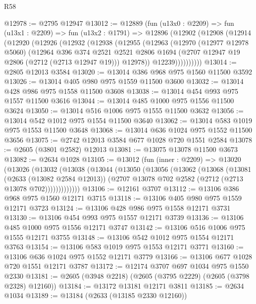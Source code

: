 \begin{lexlean}{R58}
\begin{coremodule}
@12978 := @2795 @12947
@13012 := @12889
    (fun (u13x0 : @2209) =>
    fun (u13x1 : @2209) =>
    fun (u13x2 : @1791) =>
    @12896
      (@12902
        (@12908
          (@12914
            (@12920
              (@12926
                (@12932
                  (@12938
                    (@12955
                      (@12963
                        (@12970
                          (@12977 @12978 @5060)
                          (@12964
                            @396
                            @374
                            @2521
                            @2521
                            @2806
                            @1694
                            (@2707 @12947 @19 @2806 (@2712 (@2713 @12947 @19)))
                            @12978))
                        @12239))))))))))
@13014 := @2805 @12013 @3584
@13020 := @13014 @386 @968 @975 @1560 @11500 @3592
@13026 := @13014 @405 @980 @975 @1559 @11500 @3600
@13032 := @13014 @428 @986 @975 @1558 @11500 @3608
@13038 := @13014 @454 @993 @975 @1557 @11500 @3616
@13044 := @13014 @485 @1000 @975 @1556 @11500 @3624
@13050 := @13014 @516 @1006 @975 @1555 @11500 @3632
@13056 := @13014 @542 @1012 @975 @1554 @11500 @3640
@13062 := @13014 @583 @1019 @975 @1553 @11500 @3648
@13068 := @13014 @636 @1024 @975 @1552 @11500 @3656
@13075 := @2742 @12013 @3584 @677 @1028 @720 @1551 @2584
@13078 := @2605 (@3801 @2582) @12013
@13081 := @13075 @13078 @11500 @3673
@13082 := @2634 @1028
@13105 := @13012
    (fun (inner : @2209) =>
    @13020
      (@13026
        (@13032
          (@13038
            (@13044
              (@13050
                (@13056
                  (@13062
                    (@13068
                      (@13081
                        (@2633 (@13082 @2584 @12013))
                        (@2707 @13078 @702 @2582 (@2712 (@2713 @13078 @702)))))))))))))
@13106 := @12161 @3707
@13112 := @13106 @386 @968 @975 @1560 @12171 @3715
@13118 := @13106 @405 @980 @975 @1559 @12171 @3723
@13124 := @13106 @428 @986 @975 @1558 @12171 @3731
@13130 := @13106 @454 @993 @975 @1557 @12171 @3739
@13136 := @13106 @485 @1000 @975 @1556 @12171 @3747
@13142 := @13106 @516 @1006 @975 @1555 @12171 @3755
@13148 := @13106 @542 @1012 @975 @1554 @12171 @3763
@13154 := @13106 @583 @1019 @975 @1553 @12171 @3771
@13160 := @13106 @636 @1024 @975 @1552 @12171 @3779
@13166 := @13106 @677 @1028 @720 @1551 @12171 @3787
@13172 := @12174 @3707 @697 @1034 @975 @1550 @2330
@13181 := @2605 (@3948 @2218) (@2605 (@3795 @2229) (@2605 (@3798 @2328) @12160))
@13184 := @13172 @13181 @12171 @3811
@13185 := @2634 @1034
@13189 := @13184 (@2633 (@13185 @2330 @12160))

\end{coremodule}
\end{lexlean}
